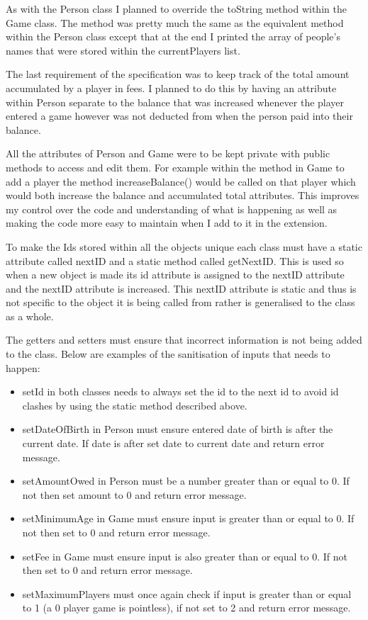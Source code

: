 \documentclass[a4paper]{article}
\begin{document}
As with the Person class I planned to override the toString method within the Game class. The method was pretty much the same as the equivalent method within the Person class except that at the end I printed the array of people's names that were stored within the currentPlayers list.

The last requirement of the specification was to keep track of the total amount accumulated by a player in fees. I planned to do this by having an attribute within Person separate to the balance that was increased whenever the player entered a game however was not deducted from when the person paid into their balance.

All the attributes of Person and Game were to be kept private with public methods to access and edit them. For example within the method in Game to add a player the method increaseBalance() would be called on that player which would both increase the balance and accumulated total attributes. This improves my control over the code and understanding of what is happening as well as making the code more easy to maintain when I add to it in the extension.

To make the Ids stored within all the objects unique each class must have a static attribute called nextID and a static method called getNextID. This is used so when a new object is made its id attribute is assigned to the nextID attribute and the nextID attribute is increased. This nextID attribute is static and thus is not specific to the object it is being called from rather is generalised to the class as a whole.

The getters and setters must ensure that incorrect information is not being added to the class. Below are examples of the sanitisation of inputs that needs to happen: \begin{itemize}
\item setId in both classes needs to always set the id to the next id to avoid id clashes by using the static method described above.
\item setDateOfBirth in Person must ensure entered date of birth is after the current date. If date is after set date to current date and return error message.
\item setAmountOwed in Person must be a number greater than or equal to 0. If not then set amount to 0 and return error message.
\item setMinimumAge in Game must ensure input is greater than or equal to 0. If not then set to 0 and return error message.
\item setFee in Game must ensure input is also greater than or equal to 0. If not then set to 0 and return error message.
\item setMaximumPlayers must once again check if input is greater than or equal to 1 (a 0 player game is pointless), if not set to 2 and return error message.
\end{itemize}
\end{document}
